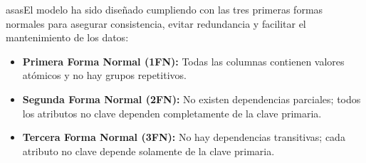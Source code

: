 asasEl modelo ha sido diseñado cumpliendo con las tres primeras formas normales para asegurar consistencia, evitar redundancia y facilitar el mantenimiento de los datos:

\begin{itemize}[label=--]
    \item \textbf{Primera Forma Normal (1FN):} Todas las columnas contienen valores atómicos y no hay grupos repetitivos.
    \item \textbf{Segunda Forma Normal (2FN):} No existen dependencias parciales; todos los atributos no clave dependen completamente de la clave primaria.
    \item \textbf{Tercera Forma Normal (3FN):} No hay dependencias transitivas; cada atributo no clave depende solamente de la clave primaria.
\end{itemize}